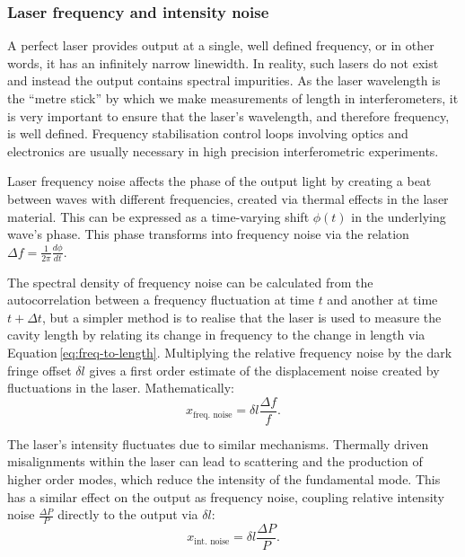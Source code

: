 \subsubsection{\label{sec:laser-noise}Laser frequency and intensity noise}
A perfect laser provides output at a single, well defined frequency, or in other words, it has an infinitely narrow linewidth. In reality, such lasers do not exist and instead the output contains spectral impurities. As the laser wavelength is the ``metre stick'' by which we make measurements of length in interferometers, it is very important to ensure that the laser's wavelength, and therefore frequency, is well defined. Frequency stabilisation control loops involving optics and electronics are usually necessary in high precision interferometric experiments.

Laser frequency noise affects the phase of the output light by creating a beat between waves with different frequencies, created via thermal effects in the laser material. This can be expressed as a time-varying shift $\phi \left( t \right)$ in the underlying wave's phase. This phase transforms into frequency noise via the relation $\Delta f = \frac{1}{2 \pi} \frac{d \phi}{dt}$.

The spectral density of frequency noise can be calculated from the autocorrelation between a frequency fluctuation at time $t$ and another at time $t + \Delta t$, but a simpler method is to realise that the laser is used to measure the cavity length by relating its change in frequency to the change in length via Equation\,\ref{eq:freq-to-length}. Multiplying the relative frequency noise by the dark fringe offset $\delta l$ gives a first order estimate of the displacement noise created by fluctuations in the laser. Mathematically:
\begin{equation}
  \label{eq:laser-freq-noise}
  x_{\text{freq. noise}} = \delta l \frac{\Delta f}{f}.
\end{equation}

The laser's intensity fluctuates due to similar mechanisms. Thermally driven misalignments within the laser can lead to scattering and the production of higher order modes, which reduce the intensity of the fundamental mode. This has a similar effect on the output as frequency noise, coupling relative intensity noise $\frac{\Delta P}{P}$ directly to the output via $\delta l$:
\begin{equation}
  \label{eq:laser-int-noise}
  x_{\text{int. noise}} = \delta l \frac{\Delta P}{P}.
\end{equation}

